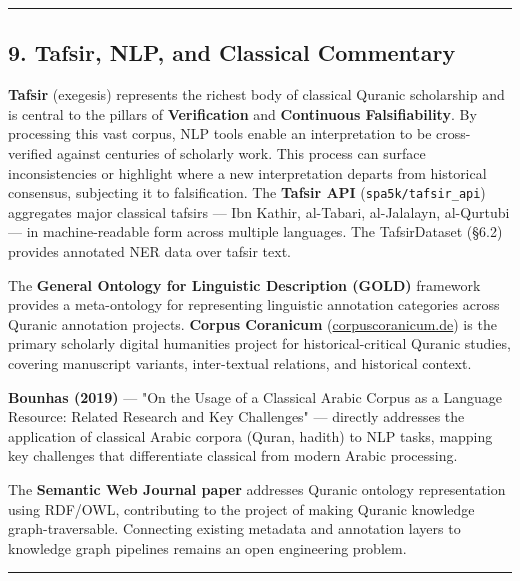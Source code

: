 \documentclass[12pt,a4paper]{article}
\begin{document}
\begin{center}\rule{0.5\linewidth}{0.5pt}\end{center}

\protect{}\label{s9}
\subsection{9. Tafsir, NLP, and Classical
Commentary}\label{tafsir-nlp-and-classical-commentary}

\textbf{Tafsir} (exegesis) represents the richest body of classical
Quranic scholarship and is central to the pillars of
\textbf{Verification} and \textbf{Continuous Falsifiability}. By
processing this vast corpus, NLP tools enable an interpretation to be
cross-verified against centuries of scholarly work. This process can
surface inconsistencies or highlight where a new interpretation departs
from historical consensus, subjecting it to falsification. The
\textbf{Tafsir API} (\texttt{spa5k/tafsir\_api}) aggregates major
classical tafsirs --- Ibn Kathir, al-Tabari, al-Jalalayn, al-Qurtubi ---
in machine-readable form across multiple languages. The TafsirDataset
(§6.2) provides annotated NER data over tafsir text.

The \textbf{General Ontology for Linguistic Description (GOLD)}
framework provides a meta-ontology for representing linguistic
annotation categories across Quranic annotation projects. \textbf{Corpus
Coranicum} (\href{https://corpuscoranicum.de}{corpuscoranicum.de}) is
the primary scholarly digital humanities project for historical-critical
Quranic studies, covering manuscript variants, inter-textual relations,
and historical context.

\textbf{Bounhas (2019)} --- "On the Usage of a Classical Arabic Corpus
as a Language Resource: Related Research and Key Challenges" ---
directly addresses the application of classical Arabic corpora (Quran,
hadith) to NLP tasks, mapping key challenges that differentiate
classical from modern Arabic processing.

The \textbf{Semantic Web Journal paper} addresses Quranic ontology
representation using RDF/OWL, contributing to the project of making
Quranic knowledge graph-traversable. Connecting existing metadata and
annotation layers to knowledge graph pipelines remains an open
engineering problem.

\begin{center}\rule{0.5\linewidth}{0.5pt}\end{center}
\end{document}
